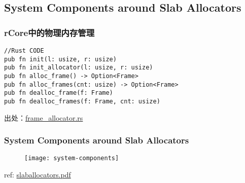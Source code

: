 \subsection{System Components around Slab Allocators} %
\begin{frame}[fragile]   
    \frametitle{rCore中的物理内存管理}

\begin{block}{}
\begin{verbatim}
//Rust CODE
pub fn init(l: usize, r: usize)
pub fn init_allocator(l: usize, r: usize)
pub fn alloc_frame() -> Option<Frame>
pub fn alloc_frames(cnt: usize) -> Option<Frame>
pub fn dealloc_frame(f: Frame)
pub fn dealloc_frames(f: Frame, cnt: usize) 
\end{verbatim}
\end{block}

出处：\href{https://github.com/rcore-os/rCore_tutorial/blob/ch4-pa2/os/src/memory/frame_allocator.rs}{frame_allocator.rs}

\end{frame}
\begin{frame}[plain,t]    
    \frametitle{System Components around Slab Allocators}
    \begin{figure}
        \centering
        \texttt{[image: system-components]}
    \end{figure}

    ref: \href{https://events.static.linuxfound.org/sites/events/files/slides/slaballocators.pdf}{slaballocators.pdf}

\end{frame}
